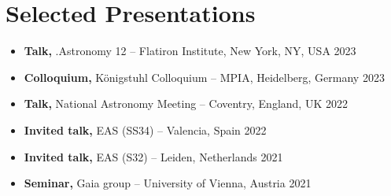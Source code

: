\section*{Selected Presentations}

\begin{itemize}
    \item \textbf{Talk,} .Astronomy 12 -- Flatiron Institute, New York, NY, USA \hfill 2023
    \item \textbf{Colloquium,} Königstuhl Colloquium -- MPIA, Heidelberg, Germany \hfill 2023
    \item \textbf{Talk,} National Astronomy Meeting -- Coventry, England, UK \hfill 2022
    \item \textbf{Invited talk,} EAS (SS34) -- Valencia, Spain \hfill 2022
    \item \textbf{Invited talk,} EAS (S32) -- Leiden, Netherlands \hfill 2021
    \item \textbf{Seminar,} Gaia group -- University of Vienna, Austria \hfill 2021
\end{itemize}